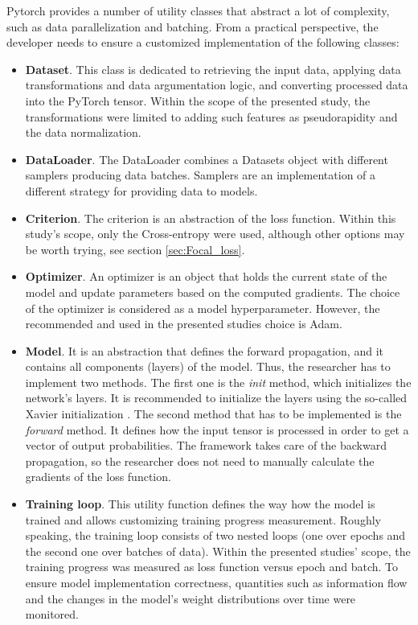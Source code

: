 Pytorch provides a number of utility classes that abstract a lot of complexity, such as data parallelization and batching. From a practical perspective, the developer needs to ensure a customized implementation of the following classes: 

\begin{itemize}
\item \textbf{Dataset}. This class is dedicated to retrieving the input data,  applying data transformations and data argumentation logic, and converting processed data into the PyTorch tensor.  Within the scope of the presented study, the transformations were limited to adding such features as pseudorapidity and the data normalization. 
 \item \textbf{DataLoader}. The DataLoader combines a Datasets object with different samplers producing data batches. Samplers are an implementation of a different strategy for providing data to models. 
\item \textbf{Criterion}. The criterion is an abstraction of the loss function. Within this study's scope, only the Cross-entropy were used, although other options may be worth trying, see section \ref{sec:Focal_loss}. 
\item \textbf{Optimizer}. An optimizer is an object that holds the current state of the model and update parameters based on the computed gradients. The choice of the optimizer is considered as a model hyperparameter. However, the recommended and used in the presented studies choice is Adam. 
\item \textbf{Model}. It is an abstraction that defines the forward propagation, and it contains all components (layers) of the model.
Thus, the researcher has to implement two methods. The first one is the \textit{init} method, which initializes the network's layers. It is recommended to initialize the layers using the so-called Xavier initialization \cite{xavier}.  The second method that has to be implemented is the \textit{forward} method. It defines how the input tensor is processed in order to get a vector of output probabilities. The framework takes care of the backward propagation, so the researcher does not need to manually calculate the gradients of the loss function. 
\item \textbf{Training loop}. This utility function defines the way how the model is trained and allows customizing training progress measurement. 
Roughly speaking, the training loop consists of two nested loops (one over epochs and the second one over batches of data). 
Within the presented studies' scope, the training progress was measured as loss function versus epoch and batch. To ensure model implementation correctness, quantities such as information flow and the changes in the model's weight distributions over time were monitored. 
\end{itemize}

